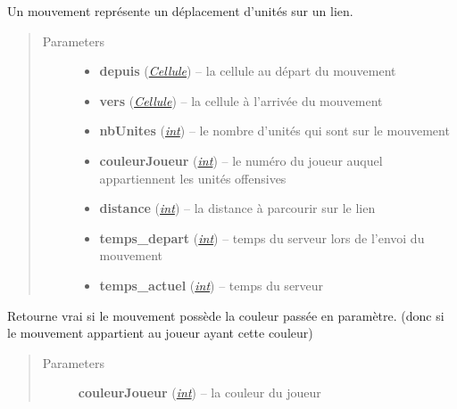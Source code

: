 \documentclass[letterpaper,10pt,english]{sphinxmanual}
\begin{document}
\begin{fulllineitems}
\label{index:Mouvement.Mouvement}
Un mouvement représente un déplacement d'unités sur un lien.
\begin{quote}\begin{description}
\item[{Parameters}] \leavevmode\begin{itemize}
\item {} 
\textbf{depuis} ({\hyperref[index:module-Cellule]{\emph{Cellule}}}) -- la cellule au départ du mouvement

\item {} 
\textbf{vers} ({\hyperref[index:module-Cellule]{\emph{Cellule}}}) -- la cellule à l'arrivée du mouvement

\item {} 
\textbf{nbUnites} (\href{http://docs.python.org/library/functions.html\#int}{\emph{int}}) -- le nombre d'unités qui sont sur le mouvement

\item {} 
\textbf{couleurJoueur} (\href{http://docs.python.org/library/functions.html\#int}{\emph{int}}) -- le numéro du joueur auquel appartiennent les unités offensives

\item {} 
\textbf{distance} (\href{http://docs.python.org/library/functions.html\#int}{\emph{int}}) -- la distance à parcourir sur le lien

\item {} 
\textbf{temps\_depart} (\href{http://docs.python.org/library/functions.html\#int}{\emph{int}}) -- temps du serveur  lors de l'envoi du mouvement

\item {} 
\textbf{temps\_actuel} (\href{http://docs.python.org/library/functions.html\#int}{\emph{int}}) -- temps du serveur

\end{itemize}

\end{description}\end{quote}

\begin{fulllineitems}
\label{index:Mouvement.Mouvement.aPourCouleur}
Retourne vrai si le mouvement possède la couleur passée en paramètre.
(donc si le mouvement appartient au joueur ayant cette couleur)
\begin{quote}\begin{description}
\item[{Parameters}] \leavevmode
\textbf{couleurJoueur} (\href{http://docs.python.org/library/functions.html\#int}{\emph{int}}) -- la couleur du joueur


\end{description}
\end{quote}
\end{fulllineitems}
\end{fulllineitems}
\end{document}
